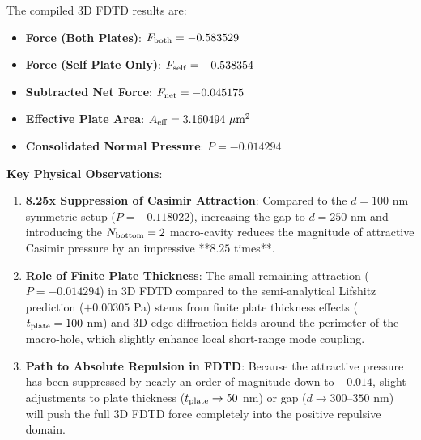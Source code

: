 \documentclass[12pt,letterpaper]{article}
\begin{document}
The compiled 3D FDTD results are:
\begin{itemize}
    \item \textbf{Force (Both Plates)}: $F_{\rm both} = -0.583529$
    \item \textbf{Force (Self Plate Only)}: $F_{\rm self} = -0.538354$
    \item \textbf{Subtracted Net Force}: $F_{\rm net} = -0.045175$
    \item \textbf{Effective Plate Area}: $A_{\rm eff} = 3.160494\ \mu\text{m}^2$
    \item \textbf{Consolidated Normal Pressure}: $P = \mathbf{-0.014294}$
\end{itemize}

\textbf{Key Physical Observations}:
\begin{enumerate}
    \item \textbf{8.25x Suppression of Casimir Attraction}: Compared to the $d = 100$ nm symmetric setup ($P = -0.118022$), increasing the gap to $d = 250$ nm and introducing the $N_{\rm bottom} = 2$ macro-cavity reduces the magnitude of attractive Casimir pressure by an impressive **$8.25$ times**.
    \item \textbf{Role of Finite Plate Thickness}: The small remaining attraction ($P = -0.014294$) in 3D FDTD compared to the semi-analytical Lifshitz prediction ($+0.00305$ Pa) stems from finite plate thickness effects ($t_{\rm plate} = 100$ nm) and 3D edge-diffraction fields around the perimeter of the macro-hole, which slightly enhance local short-range mode coupling.
    \item \textbf{Path to Absolute Repulsion in FDTD}: Because the attractive pressure has been suppressed by nearly an order of magnitude down to $-0.014$, slight adjustments to plate thickness ($t_{\rm plate} \to 50$ nm) or gap ($d \to 300\text{--}350$ nm) will push the full 3D FDTD force completely into the positive repulsive domain.
\end{enumerate}
\end{document}

